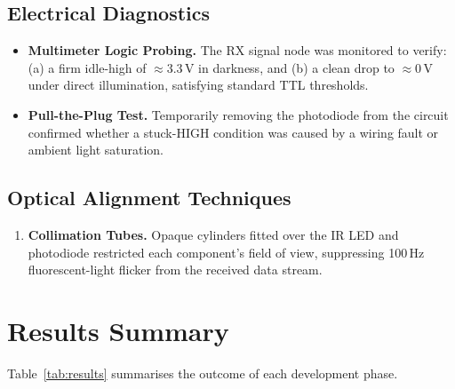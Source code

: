 \documentclass[10pt, twocolumn, a4paper]{article}
\begin{document}
\subsection{Electrical Diagnostics}

\begin{itemize}[leftmargin=12pt, itemsep=2pt]
  \item \textbf{Multimeter Logic Probing.} The RX signal node was monitored to verify: (a) a firm idle-high of $\approx3.3$\,V in darkness, and (b) a clean drop to $\approx0$\,V under direct illumination, satisfying standard TTL thresholds.

  \item \textbf{Pull-the-Plug Test.} Temporarily removing the photodiode from the circuit confirmed whether a stuck-HIGH condition was caused by a wiring fault or ambient light saturation.
\end{itemize}

\subsection{Optical Alignment Techniques}

\begin{enumerate}[leftmargin=16pt, itemsep=2pt]
  \item \textbf{Collimation Tubes.} Opaque cylinders fitted over the IR LED and photodiode restricted each component's field of view, suppressing 100\,Hz fluorescent-light flicker from the received data stream.

\end{enumerate}

\section{Results Summary}

Table~\ref{tab:results} summarises the outcome of each development phase.
\end{document}
